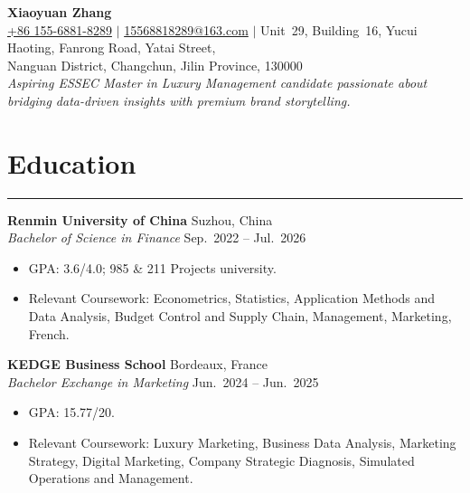 \documentclass[11pt,a4paper]{article}
\newcommand{\resumeSection}[1]{\section*{#1}\vspace{-0.5em}\hrule\vspace{0.6em}}
\newcommand{\resumeSubsection}[4]{
  \textbf{#1} \hfill {#2}\\
  \textit{#3} \hfill {#4}
}
\newcommand{\resumeItem}[1]{\item #1}
\begin{document}
\begin{center}
  {\LARGE \textbf{Xiaoyuan Zhang}}\\[4pt]
  \href{tel:+8615568818289}{+86 155-6881-8289} $\vert$
  \href{mailto:15568818289@163.com}{15568818289@163.com} $\vert$
  Unit~29, Building~16, Yucui Haoting, Fanrong Road, Yatai Street,\\
  Nanguan District, Changchun, Jilin Province, 130000\\[6pt]
  \textit{Aspiring ESSEC Master in Luxury Management candidate passionate about bridging data-driven insights with premium brand storytelling.}
\end{center}

\vspace{0.5em}

\resumeSection{Education}
\resumeSubsection{Renmin University of China}{Suzhou, China}{Bachelor of Science in Finance}{Sep.~2022 -- Jul.~2026}
\begin{itemize}
  \resumeItem{GPA: 3.6/4.0; 985 \& 211 Projects university.}
  \resumeItem{Relevant Coursework: Econometrics, Statistics, Application Methods and Data Analysis, Budget Control and Supply Chain, Management, Marketing, French.}
\end{itemize}
\vspace{0.4em}
\resumeSubsection{KEDGE Business School}{Bordeaux, France}{Bachelor Exchange in Marketing}{Jun.~2024 -- Jun.~2025}
\begin{itemize}
  \resumeItem{GPA: 15.77/20.}
  \resumeItem{Relevant Coursework: Luxury Marketing, Business Data Analysis, Marketing Strategy, Digital Marketing, Company Strategic Diagnosis, Simulated Operations and Management.}
\end{itemize}
\end{document}
